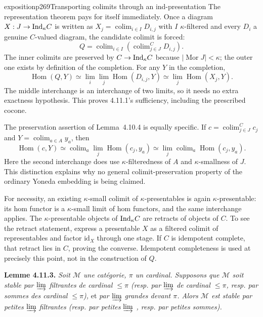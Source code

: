 \begin{dcomment}{exposition}{p269}{Transporting colimits through an ind-presentation}
The representation theorem pays for itself immediately. Once a diagram $X:J\to\mathrm{Ind}_\kappa C$ is written as $X_j=\operatorname{colim}_{i\in I}D_{i,j}$ with $I$ $\kappa$-filtered and every $D_i$ a genuine $C$-valued diagram, the candidate colimit is forced:
\[
 Q=\operatorname{colim}_{i\in I}\left(\operatorname{colim}_{j\in J}^{C}D_{i,j}\right).
\]
The inner colimits are preserved by $C\to\mathrm{Ind}_\kappa C$ because $|\operatorname{Mor}J|<\kappa$; the outer one exists by definition of the completion. For any $Y$ in the completion,
\[
 \operatorname{Hom}(Q,Y)
 \simeq\lim_i\lim_j\operatorname{Hom}(D_{i,j},Y)
 \simeq\lim_j\operatorname{Hom}(X_j,Y).
\]
The middle interchange is an interchange of two limits, so it needs no extra exactness hypothesis. This proves 4.11.1's sufficiency, including the prescribed cocone.

The preservation assertion of Lemma~4.10.4 is equally specific. If $c=\operatorname{colim}_{j\in J}^{C}c_j$ and $Y=\operatorname{colim}_{a\in A}y_a$, then
\[
 \operatorname{Hom}(c,Y)
 \simeq\operatorname{colim}_a\lim_j\operatorname{Hom}(c_j,y_a)
 \simeq\lim_j\operatorname{colim}_a\operatorname{Hom}(c_j,y_a).
\]
Here the second interchange does use $\kappa$-filteredness of $A$ and $\kappa$-smallness of $J$. This distinction explains why no general colimit-preservation property of the ordinary Yoneda embedding is being claimed.

For necessity, an existing $\kappa$-small colimit of $\kappa$-presentables is again $\kappa$-presentable: its hom functor is a $\kappa$-small limit of hom functors, and the same interchange applies. The $\kappa$-presentable objects of $\mathrm{Ind}_\kappa C$ are retracts of objects of $C$. To see the retract statement, express a presentable $X$ as a filtered colimit of representables and factor $\mathrm{id}_X$ through one stage. If $C$ is idempotent complete, that retract lies in $C$, proving the converse. Idempotent completeness is used at precisely this point, not in the construction of $Q$.
\end{dcomment}


\textbf{Lemme 4.11.3.} \textit{Soit $\mathcal{M}$ une catégorie, $\pi$ un cardinal. Supposons que $\mathcal{M}$ soit stable par $\varinjlim$ filtrantes de cardinal $\leqslant \pi$ (resp. par $\varinjlim$ de cardinal $\leqslant \pi$, resp. par sommes des cardinal $\leqslant \pi$),} et \textit{par $\varinjlim$ grandes devant $\pi$. Alors $\mathcal{M}$ est stable par petites $\varinjlim$ filtrantes (resp. par petites $\varinjlim$ , resp. par petites sommes).} %

